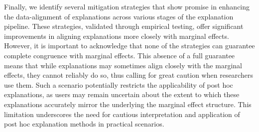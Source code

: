 \documentclass[mnsc,blindrev]{informs3}
\begin{document}
        
         Finally, we identify several mitigation strategies that show promise in enhancing the data-alignment of explanations across various stages of the explanation pipeline. These strategies, validated through empirical testing, offer significant improvements in aligning explanations more closely with marginal effects. However, it is important to acknowledge that none of the strategies can guarantee complete congruence with marginal effects. This absence of a full guarantee means that while explanations may sometimes align closely with the marginal effects, they cannot reliably do so, thus calling for great caution when researchers use them. Such a scenario potentially restricts the applicability of post hoc explanations, as users may remain uncertain about the extent to which these explanations accurately mirror the underlying the marginal effect structure. This limitation underscores the need for cautious interpretation and application of post hoc explanation methods in practical scenarios.
        
        

            



        
\end{document}
